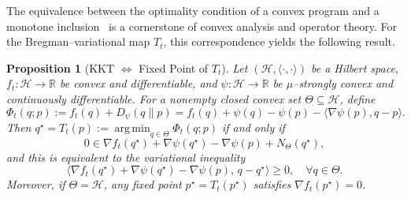 \documentclass[11pt]{article}
\newcommand{\inner}[2]{\langle #1 , #2 \rangle}
\DeclareMathOperator*{\argmin}{arg\,min}
\theoremstyle{plain}
\newtheorem{proposition}[theorem]{Proposition}
\theoremstyle{definition}
\theoremstyle{remark}
\begin{document}

The equivalence between the optimality condition of a convex program
and a monotone inclusion~\cite{Rockafellar1970,Rockafellar1976,Bauschke2011}
is a cornerstone of convex analysis and operator theory.
For the Bregman–variational map $T_t$, this correspondence
yields the following result.

\begin{proposition}[KKT $\Longleftrightarrow$ Fixed Point of $T_t$]
\label{prop:kkt-fp}
Let $(\mathcal H,\inner{\cdot}{\cdot})$ be a Hilbert space, 
$f_t:\mathcal H\!\to\!\mathbb R$ be convex and differentiable, and 
$\psi:\mathcal H\!\to\!\mathbb R$ be $\mu$–strongly convex and continuously differentiable.
For a nonempty closed convex set $\Theta\subseteq\mathcal H$, define
\begin{equation}
\Phi_t(q;p):=f_t(q)+D_\psi(q\|p)
=f_t(q)+\psi(q)-\psi(p)-\inner{\nabla\psi(p)}{q-p}.
\label{eq:phi-def}
\end{equation}
Then $q^\star=T_t(p):=\argmin_{q\in\Theta}\Phi_t(q;p)$ if and only if
\begin{equation}
0\in \nabla f_t(q^\star)+\nabla\psi(q^\star)-\nabla\psi(p)+N_\Theta(q^\star),
\label{eq:kkt-final}
\end{equation}
and this is equivalent to the variational inequality
\begin{equation}
\langle\nabla f_t(q^\star)+\nabla\psi(q^\star)-\nabla\psi(p),\,q-q^\star\rangle\ge0,
\quad\forall q\in\Theta.
\label{eq:vi-final}
\end{equation}
Moreover, if $\Theta=\mathcal H$, any fixed point $p^\star=T_t(p^\star)$ satisfies
$\nabla f_t(p^\star)=0$.
\end{proposition}
\end{document}
